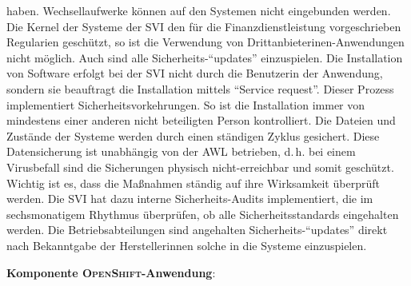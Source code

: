 haben. Wechsellaufwerke können auf den Systemen nicht eingebunden werden. Die Kernel der Systeme der \ac{SVI} den für die Finanzdienstleistung vorgeschrieben Regularien geschützt, so ist die Verwendung von Drittanbieterinen-Anwendungen nicht möglich. Auch sind alle Sicherheits-\enquote{updates} einzuspielen. Die Installation von Software erfolgt bei der \ac{SVI} nicht durch die Benutzerin der Anwendung, sondern sie beauftragt die Installation mittels \enquote{Service request}. Dieser Prozess implementiert Sicherheitsvorkehrungen. So ist die Installation immer von mindestens einer anderen nicht beteiligten Person kontrolliert. Die Dateien und Zustände der Systeme werden durch einen ständigen Zyklus gesichert. Diese Datensicherung ist unabhängig von der \ac{AWL} betrieben, d.\,h. bei einem Virusbefall sind die Sicherungen physisch nicht-erreichbar und somit geschützt. Wichtig ist es, dass die Maßnahmen ständig auf ihre Wirksamkeit überprüft werden. Die \ac{SVI} hat dazu interne Sicherheits-Audits implementiert, die im sechsmonatigem Rhythmus überprüfen, ob alle Sicherheitsstandards eingehalten werden. Die Betriebsabteilungen sind angehalten Sicherheits-\enquote{updates} direkt nach Bekanntgabe der Herstellerinnen solche in die Systeme einzuspielen.
\par
\textbf{Komponente \textsc{OpenShift}-Anwendung}:
\par

